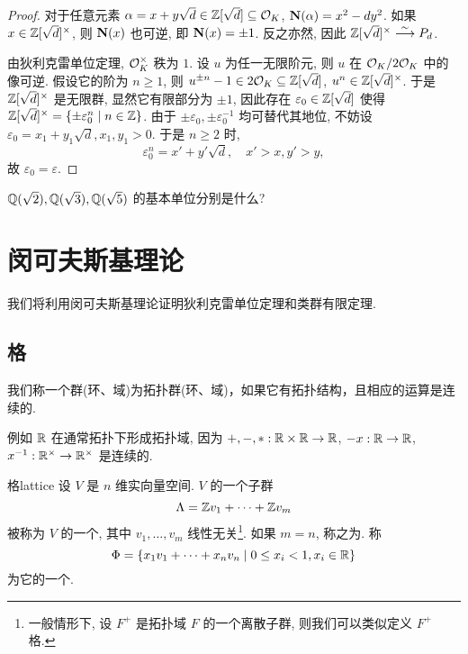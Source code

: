 \begin{proof}
对于任意元素 $\alpha=x+y\sqrt{d}\in {\mathbb{Z}}[\sqrt{d}]\subseteq {\mathcal{O}}_K$, ${\mathbf{N}}(\alpha)=x^2-dy^2$. 如果 $x\in{\mathbb{Z}}[\sqrt{d}]^\times$, 则 ${\mathbf{N}}(x)$ 也可逆, 即 ${\mathbf{N}}(x)=\pm 1$. 反之亦然, 因此 ${\mathbb{Z}}[\sqrt{d}]^\times\stackrel{\sim}{\longrightarrow} P_d$.

由狄利克雷单位定理, ${\mathcal{O}}_K^\times$ 秩为 $1$. 设 $u$ 为任一无限阶元, 则 $u$ 在 ${\mathcal{O}}_K/2{\mathcal{O}}_K$ 中的像可逆. 假设它的阶为 $n\ge 1$, 则 $u^{\pm n}-1\in 2{\mathcal{O}}_K\subseteq {\mathbb{Z}}[\sqrt{d}]$, $u^n\in {\mathbb{Z}}[\sqrt{d}]^\times$. 于是 ${\mathbb{Z}}[\sqrt{d}]^\times$ 是无限群, 显然它有限部分为 $\pm 1$, 因此存在 $\varepsilon_0\in{\mathbb{Z}}[\sqrt{d}]$ 使得 ${\mathbb{Z}}[\sqrt{d}]^\times=\left\{\pm\varepsilon_0^n\mid n\in{\mathbb{Z}}\right\}$. 由于 $\pm \varepsilon_0,\pm \varepsilon_0^{-1}$ 均可替代其地位, 不妨设 $\varepsilon_0=x_1+y_1\sqrt{d},x_1,y_1>0$. 于是 $n\ge 2$ 时,
  \[\varepsilon_0^n=x'+y'\sqrt{d},\quad x'>x,y'>y,\]
故 $\varepsilon_0=\varepsilon$.
\end{proof}

\begin{exercise}
${\mathbb{Q}}(\sqrt{2}), {\mathbb{Q}}(\sqrt{3}), {\mathbb{Q}}(\sqrt{5})$ 的基本单位分别是什么?
\end{exercise}



\section{闵可夫斯基理论}
我们将利用闵可夫斯基理论证明狄利克雷单位定理和类群有限定理.

\subsection{格}
我们称一个群(环、域)为拓扑群(环、域)，如果它有拓扑结构，且相应的运算是连续的.
\begin{example}
例如 ${\mathbb{R}}$ 在通常拓扑下形成拓扑域, 因为 $+,-,*:{\mathbb{R}}\times{\mathbb{R}}\to {\mathbb{R}}$, $-x:{\mathbb{R}}\to {\mathbb{R}}$, $x^{-1}:{\mathbb{R}}^\times\to {\mathbb{R}}^\times$ 是连续的.
\end{example}

\begin{definition}{格}{lattice}
设 $V$ 是 $n$ 维实向量空间. $V$ 的一个子群
  \[\Lambda={\mathbb{Z}} v_1+\dots+{\mathbb{Z}} v_m\]
被称为 $V$ 的一个, 其中 $v_1,\dots,v_m$ 线性无关\footnote{一般情形下, 设 $F^+$ 是拓扑域 $F$ 的一个离散子群, 则我们可以类似定义 $F^+$ 格.}. 如果 $m=n$, 称之为. 称
  \[\Phi=\left\{x_1 v_1+\dots+x_n v_n\mid 0\le x_i<1,x_i\in{\mathbb{R}}\right\}\]
为它的一个.
\end{definition}

